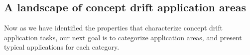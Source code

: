 \documentclass{llncs}
\begin{document}



\subsection{A landscape of concept drift application areas}
Now as we have identified the properties that characterize concept drift application tasks,
our next goal is to categorize application areas, and present typical applications for each category.
\end{document}
